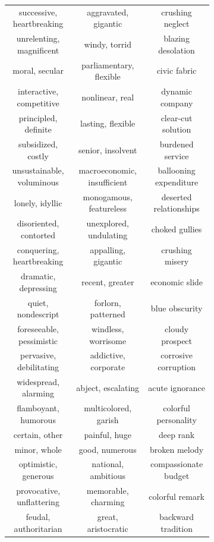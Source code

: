 \documentclass[9pt,twocolumn,twoside,lineno]{pnas-new}
\begin{document}
\begin{figure}
\begin{subfigure}{0.3\textwidth}
\begin{center}
\begin{tabular}{ c | c | c  }
			\tiny successive, heartbreaking & \tiny aggravated, gigantic & \tiny crushing neglect\\
			\tiny unrelenting, magnificent & \tiny windy, torrid & \tiny blazing desolation\\
			\tiny moral, secular & \tiny parliamentary, flexible & \tiny civic fabric\\
			\tiny interactive, competitive & \tiny nonlinear, real & \tiny dynamic company\\
			\tiny principled, definite & \tiny lasting, flexible & \tiny clear-cut solution\\
			\tiny subsidized, costly & \tiny senior, insolvent & \tiny burdened service\\
			\tiny unsustainable, voluminous & \tiny macroeconomic, insufficient & \tiny ballooning expenditure\\
			\tiny lonely, idyllic & \tiny monogamous, featureless & \tiny deserted relationships\\
			\tiny disoriented, contorted & \tiny unexplored, undulating & \tiny choked gullies\\
			\tiny conquering, heartbreaking & \tiny appalling, gigantic & \tiny crushing misery\\
			\tiny dramatic, depressing & \tiny recent, greater & \tiny economic slide\\
			\tiny quiet, nondescript & \tiny forlorn, patterned & \tiny blue obscurity\\
			\tiny foreseeable, pessimistic & \tiny windless, worrisome & \tiny cloudy prospect\\
			\tiny pervasive, debilitating & \tiny addictive, corporate & \tiny corrosive corruption\\
			\tiny widespread, alarming & \tiny abject, escalating & \tiny acute ignorance\\
			\tiny flamboyant, humorous & \tiny multicolored, garish & \tiny colorful personality\\
			\tiny certain, other & \tiny painful, huge & \tiny deep rank\\
			\tiny minor, whole & \tiny good, numerous & \tiny broken melody\\
			\tiny optimistic, generous & \tiny national, ambitious & \tiny compassionate budget\\
			\tiny provocative, unflattering & \tiny memorable, charming & \tiny colorful remark\\
			\tiny feudal, authoritarian & \tiny great, aristocratic & \tiny backward tradition\\

\end{tabular}
\end{center}
\end{subfigure}
\end{figure}
\end{document}

